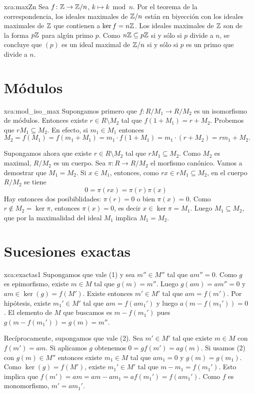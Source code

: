 \begin{sol}{xca:maxZn}
Sea $f\colon\mathbb{Z}\to \mathbb{Z}/n$, $k\mapsto k\bmod n$. Por el teorema de la correspondencia, los ideales
maximales de $\mathbb{Z}/n$ están en biyección con los ideales maximales de $\mathbb{Z}$ que contienen a $\ker f=n\mathbb{Z}$. 
Los ideales maximales de $\mathbb{Z}$ son de la forma $p\mathbb{Z}$ para algún primo $p$. 
Como $n\mathbb{Z}\subseteq p\mathbb{Z}$ si y sólo si $p$ divide a $n$, se concluye que 
$(p)$ es un ideal maximal de $\mathbb{Z}/n$ si y sólo si $p$ es un primo que divide a $n$.  
\end{sol}

\section*{Módulos}

\begin{sol}{xca:mod_iso_max}
    Supongamos primero que $f\colon R/M_1\to R/M_2$ es un isomorfismo de
    módulos. Entonces existe $r\in R\setminus M_2$ tal que $f(1+M_1)=r+M_2$.
    Probemos que $rM_1\subseteq M_2$. En efecto, si $m_1\in M_1$ entonces
    \[
    M_2=f(M_1)=f(m_1+M_1)=m_1\cdot f(1+M_1)=m_1\cdot (r+M_2)=rm_1+M_2. 
    \]
    
    Supongamos ahora que existe $r\in R\setminus M_2$ tal que
    $rM_1\subseteq M_2$.  Como $M_2$ es maximal, $R/M_2$ es un cuerpo. Sea $\pi\colon R\to R/M_2$ el morfismo canónico. Vamos
    a demostrar que $M_1=M_2$. Si $x\in M_1$, entonces, como $rx\in rM_1\subseteq M_2$, en el cuerpo $R/M_2$ se tiene  
    \[
    0=\pi(rx)=\pi(r)\pi(x)
    \]
    Hay entonces dos posibiblidades: $\pi(r)=0$ o bien $\pi(x)=0$. Como $r\not\in M_2=\ker\pi$, 
    entonces $\pi(x)=0$, es decir $x\in\ker \pi=M_1$. Luego $M_1\subseteq M_2$, que por la maximalidad
    del ideal $M_1$ implica $M_1=M_2$. 
\end{sol}


\section*{Sucesiones exactas}

\begin{sol}{xca:exactas1}
			Supongamos que vale (1) y sea $m''\in M''$ tal que $am''=0$. Como $g$ es
			epimorfismo, existe $m\in M$ tal que $g(m)=m''$. Luego $g(am)=am''=0$ y
			$am\in\ker(g)=f(M')$. Existe entonces $m'\in M'$ tal que $am=f(m')$. Por
			hipótesis, existe $m_1'\in M'$ tal que $am=f(am_1')$ y luego
			$a(m-f(m_1'))=0$. El elemento de $M$ que buscamos es $m-f(m_1')$ pues
			$g(m-f(m_1'))=g(m)=m''$.

			Recíprocamente, supongamos que vale (2). Sea $m'\in M'$ tal que existe
			$m\in M$ con $f(m')=am$. Si aplicamos $g$ obtenemos $0=gf(m')=ag(m)$. Si
			usamos (2) con $g(m)\in M''$ entonces existe $m_1\in M$ tal que $am_1=0$
			y $g(m)=g(m_1)$. Como $\ker(g)=f(M')$, existe $m_1'\in M'$ tal que
			$m-m_1=f(m_1')$. Esto implica que $f(m')=am=am-am_1=af(m_1')=f(am_1')$.
			Como $f$ es monomorfismo, $m'=am_1'$.
\end{sol}

